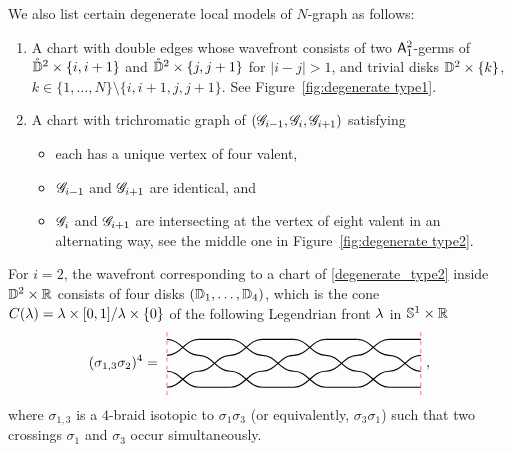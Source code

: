 We also list certain degenerate local models of $N$-graph as follows:
\begin{enumerate}[Type~D1]
\item A chart with double edges whose wavefront consists of two $\mathsf{A}_1^2$-germs of $\mathring{\mathbb{D}}^2\times\{i,i+1\}$ and $\mathring{\mathbb{D}}^2\times\{j,j+1\}$ for $|i-j|>1$, and trivial disks $\mathbb{D}^2\times\{k\}$, $k\in \{1,\dots,N\}\setminus\{i,i+1,j,j+1\}$.
See Figure~\ref{fig:degenerate type1}.

\item A chart with trichromatic graph of $(\mathscr{G}_{i-1},\mathscr{G}_i,\mathscr{G}_{i+1})$ satisfying \label{degenerate_type2}
\begin{itemize}
\item each has a unique vertex of four valent,
\item $\mathscr{G}_{i-1}$ and $\mathscr{G}_{i+1}$ are identical, and
\item $\mathscr{G}_i$ and $\mathscr{G}_{i+1}$ are intersecting at the vertex of eight valent in an alternating way, see the middle one in Figure~\ref{fig:degenerate type2}.
\end{itemize}
\end{enumerate}

For $i=2$, the wavefront corresponding to a chart of \ref{degenerate_type2} inside $\mathbb{D}^2\times \mathbb{R}$ consists of four disks $(\mathbb{D}_1,\dots,\mathbb{D}_4)$, which is the cone $C(\lambda)=\lambda\times[0,1]/\lambda\times\{0\}$ of the following Legendrian front $\lambda$ in $\mathbb{S}^1\times\mathbb{R}$
\[
(\sigma_{1,3}\sigma_2)^4=\vcenter{\hbox{
\begin{tikzpicture}[scale=0.8]
\begin{scope}
\foreach \x in {0,2,4,6}
{
\draw[thick] (\x,0) to[out=0,in=180] (\x+1,0.5);
\draw[thick] (\x,0.5) to[out=0,in=180] (\x+1,0);
}
\draw[thick] (1,0) -- (2,0) (3,0)--(4,0) (5,0)--(6,0) (7,0)--(8,-0);
\end{scope}
\begin{scope}[xshift=1cm,yshift=0.5cm]
\foreach \x in {0,2,4,6}
{
\draw[thick] (\x,0) to[out=0,in=180] (\x+1,0.5);
\draw[thick] (\x,0.5) to[out=0,in=180] (\x+1,0);
}
\end{scope}
\begin{scope}[yshift=1cm]
\foreach \x in {0,2,4,6}
{
\draw[thick] (\x,0) to[out=0,in=180] (\x+1,0.5);
\draw[thick] (\x,0.5) to[out=0,in=180] (\x+1,0);
}
\draw[thick] (1,0.5) -- (2,0.5) (3,0.5)--(4,0.5) (5,0.5)--(6,0.5) (7,0.5)--(8,0.5);
\end{scope}
\draw[red, dashed] (0,-0.25)--(0,1.75)  (8,-0.25)--(8,1.75);
\end{tikzpicture}
}},
\] 
where $\sigma_{1,3}$ is a $4$-braid isotopic to $\sigma_1\sigma_3$ (or equivalently, $\sigma_3\sigma_1$) such that two crossings $\sigma_1$ and $\sigma_3$ occur simultaneously. 


